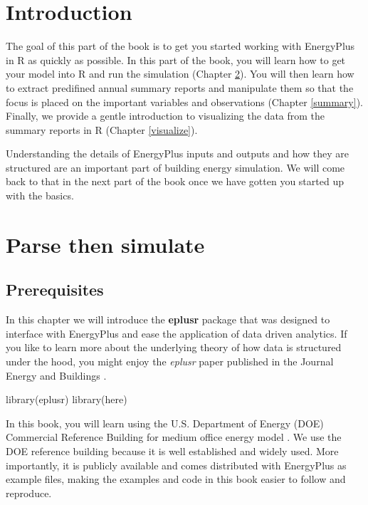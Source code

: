 \documentclass[
]{book}
\newenvironment{Shaded}{\begin{snugshade}}{\end{snugshade}}
\newcommand{\FunctionTok}[1]{\textcolor[rgb]{0.00,0.00,0.00}{#1}}
\newcommand{\NormalTok}[1]{#1}
\begin{document}
\hypertarget{get-started}{%
\chapter{Introduction}\label{get-started}}

The goal of this part of the book is to get you started working with EnergyPlus in R as quickly as possible. In this part of the book, you will learn how to get your model into R and run the simulation (Chapter \ref{parse}). You will then learn how to extract predifined annual summary reports and manipulate them so that the focus is placed on the important variables and observations (Chapter \ref{summary}). Finally, we provide a gentle introduction to visualizing the data from the summary reports in R (Chapter \ref{visualize}).

Understanding the details of EnergyPlus inputs and outputs and how they are structured are an important part of building energy simulation. We will come back to that in the next part of the book once we have gotten you started up with the basics.

\hypertarget{parse}{%
\chapter{Parse then simulate}\label{parse}}

\hypertarget{prerequisites-7}{%
\section{Prerequisites}\label{prerequisites-7}}

In this chapter we will introduce the \textbf{eplusr} package that was designed to interface with EnergyPlus and ease the application of data driven analytics. If you like to learn more about the underlying theory of how data is structured under the hood, you might enjoy the \emph{eplusr} paper published in the Journal Energy and Buildings \citep{jia_eplusr_2021}.

\begin{Shaded}
\begin{Highlighting}[]
\FunctionTok{library}\NormalTok{(eplusr)}
\FunctionTok{library}\NormalTok{(here)}
\end{Highlighting}
\end{Shaded}

In this book, you will learn using the U.S. Department of Energy (DOE) Commercial Reference Building for medium office energy model \citep{deru_us_2011}. We use the DOE reference building because it is well established and widely used. More importantly, it is publicly available and comes distributed with EnergyPlus as example files, making the examples and code in this book easier to follow and reproduce.
\end{document}

